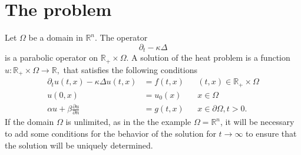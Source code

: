 %
%
%
\section{The problem}
Let $\Omega$ be a domain in $\mathbb R^n$.
The operator
\[
\partial_t-\kappa\Delta
\]
is a parabolic operator on $\mathbb R_+\times\Omega$.
A solution of the heat problem is a function
$u\colon\mathbb R_+\times\Omega\to\mathbb R,$
that satisfies the following conditions
\begin{align*}
\partial_tu(t,x)-\kappa\Delta u(t,x)&=f(t,x)&&(t,x)\in\mathbb R_+\times\Omega
\\
u(0,x)&=u_0(x)&&x\in\Omega
\\
\alpha u+\beta\frac{\partial u}{\partial n}&=g(t, x)&&x\in\partial\Omega, t>0.
\end{align*}
If the domain $\Omega$ is unlimited, as in the the example $\Omega=\mathbb R^n$,
it will be necessary to add some conditions for the behavior of the
solution for $t\to\infty$ to ensure that the solution will be 
uniquely determined.

